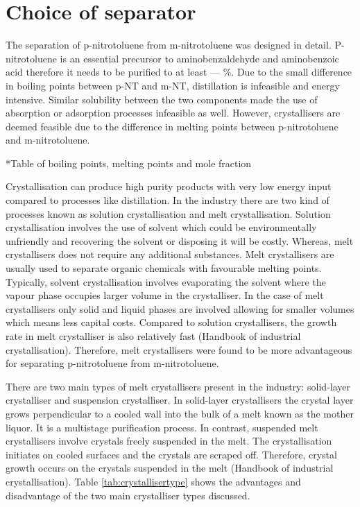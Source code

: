 \section{Choice of separator}
The separation of p-nitrotoluene from m-nitrotoluene was designed in detail. P-nitrotoluene is an essential precursor to aminobenzaldehyde and aminobenzoic acid therefore it needs to be purified to at least --- \%. Due to the small difference in boiling points between p-NT and m-NT, distillation is infeasible and energy intensive. Similar solubility between the two components made the use of absorption or adsorption processes infeasible as well. However, crystallisers are deemed feasible due to the difference in melting points between p-nitrotoluene and m-nitrotoluene.

*Table of boiling points, melting points and mole fraction 

Crystallisation can produce high purity products with very low energy input compared to processes like distillation. In the industry there are two kind of processes known as solution crystallisation and melt crystallisation. Solution crystallisation involves the use of solvent which could be environmentally unfriendly and recovering the solvent or disposing it will be costly. Whereas, melt crystallisers does not require any additional substances. Melt crystallisers are usually used to separate organic chemicals with favourable melting points. Typically, solvent crystallisation involves evaporating the solvent where the vapour phase occupies larger volume in the crystalliser. In the case of melt crystallisers only solid and liquid phases are involved allowing for smaller volumes which means less capital costs. Compared to solution crystallisers, the growth rate in melt crystalliser is also relatively fast (Handbook of industrial crystallisation). Therefore, melt crystallisers were found to be more advantageous for separating p-nitrotoluene from m-nitrotoluene. 

There are two main types of melt crystallisers present in the industry: solid-layer crystalliser and suspension crystalliser. In solid-layer crystallisers the crystal layer grows perpendicular to a cooled wall into the bulk of a melt known as the mother liquor. It is a multistage purification process. In contrast, suspended melt crystallisers involve crystals freely suspended in the melt. The crystallisation initiates on cooled surfaces and the crystals are scraped off. Therefore, crystal growth occurs on the crystals suspended in the melt (Handbook of industrial crystallisation). Table \ref{tab:crystallisertype} shows the advantages and disadvantage of the two main crystalliser types discussed. 

